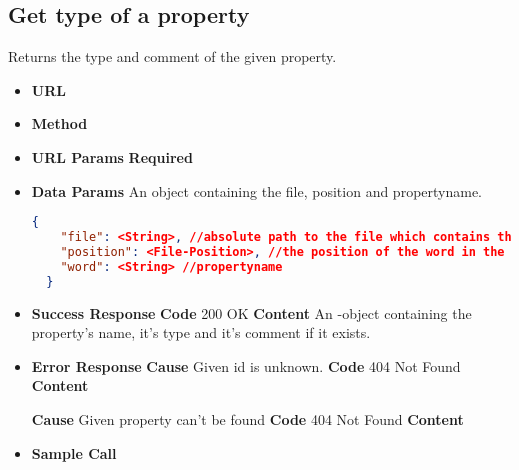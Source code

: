 \subsection{Get type of a property}
Returns the type and comment of the given property.
\begin{itemize}
\item \textbf{URL} 
\item \textbf{Method} 

\item \textbf{URL Params}
  \newline\textbf{Required} 

\item \textbf{Data Params} An object containing the file, position and propertyname.
  \newline{}
  \begin{lstlisting}[basicstyle=\small,language=json]
  {
    "file": <String>, //absolute path to the file which contains the word/symbol
    "position": <File-Position>, //the position of the word in the file
    "word": <String> //propertyname
  }
  \end{lstlisting}

\item \textbf{Success Response}
  \newline\textbf{Code} 200 OK
  \newline\textbf{Content} An -object containing the property's name,
  it's type and it's comment if it exists.

\item \textbf{Error Response}
  \newline\textbf{Cause} Given id is unknown.
  \newline\textbf{Code} 404 Not Found
  \newline\textbf{Content} 

  \fixedspace\textbf{Cause} Given property can't be found
  \newline\textbf{Code} 404 Not Found
  \newline\textbf{Content} 

\item \textbf{Sample Call}
\end{itemize}
